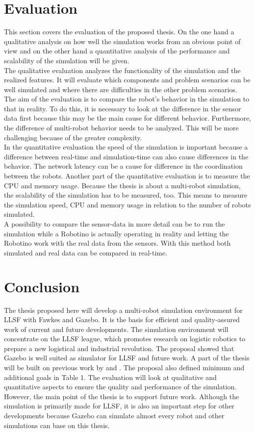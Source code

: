 \documentclass[a4paper,11pt]{article}
\begin{document}
\section{Evaluation}
This section covers the evaluation of the proposed thesis. On the one hand a qualitative analysis on how well the simulation works from an obvious point of view and on the other hand a quantitative analysis of the performance and scalability of the simulation will be given.\\
The qualitative evaluation analyzes the functionality of the simulation and the realized features. It will evaluate which components and problem scenarios can be well simulated and where there are difficulties in the other problem scenarios. The aim of the evaluation is to compare the robot's behavior in the simulation to that in reality. To do this, it is necessary to look at the difference in the sensor data first because this may be the main cause for different behavior. Furthermore, the difference of multi-robot behavior needs to be analyzed. This will be more challenging because of the greater complexity.\\
In the quantitative evaluation the speed of the simulation is important because a difference between real-time and simulation-time can also cause differences in the behavior. The network latency can be a cause for difference in the coordination between the robots. Another part of the quantitative evaluation is to measure the CPU and memory usage. Because the thesis is about a multi-robot simulation, the scalability of the simulation has to be measured, too. This means to measure the simulation speed, CPU and memory usage in relation to the number of robots simulated.\\
A possibility to compare the sensor-data in more detail can be to run the simulation while a Robotino is actually operating in reality and letting the Robotino work with the real data from the sensors. With this method both simulated and real data can be compared in real-time.

\section{Conclusion}
The thesis proposed here will develop a multi-robot simulation environment for LLSF with Fawkes and Gazebo. It is the basis for efficient and quality-assured work of current and future developments. The simulation environment will concentrate on the LLSF league, which promotes research on logistic robotics to prepare a new logistical and industrial revolution. The proposal showed that Gazebo is well suited as simulator for LLSF and future work. A part of the thesis will be built on previous work by \cite{KlingenDA} and \cite{MultiLevelAbstraction}. The proposal also defined minimum and additional goals in Table 1. The evaluation will look at qualitative and quantitative aspects to ensure the quality and performance of the simulation.\\
However, the main point of the thesis is to support future work. Although the simulation is primarily made for LLSF, it is also an important step for other developments because Gazebo can simulate almost every robot and other simulations can base on this thesis.




\end{document}
